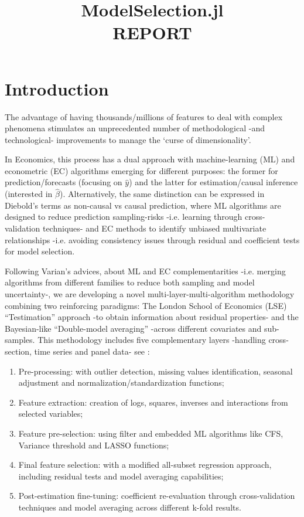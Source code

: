 \documentclass{article}
\title{ModelSelection.jl \\
       \vspace{5mm} REPORT}
\begin{document}
\maketitle

\vspace{5mm}
\tableofcontents
\clearpage


\section{Introduction}
The advantage of having thousands/millions of features to deal with complex phenomena stimulates an unprecedented number of methodological -and technological- improvements to manage the ‘curse of dimensionality’. 

In Economics, this process has a dual approach with machine-learning (ML) and econometric (EC) algorithms emerging for different purposes: the former for prediction/forecasts (focusing on $\hat{y}$) and the latter for estimation/causal inference (interested in $\hat{\beta}$). Alternatively, the same distinction can be expressed in Diebold’s terms as non-causal vs causal prediction, where ML algorithms are designed to reduce prediction sampling-risks -i.e. learning through cross-validation techniques- and EC methods to identify unbiased multivariate relationships -i.e. avoiding consistency issues through residual and coefficient tests for model selection. 

Following Varian’s advices, about ML and EC complementarities -i.e. merging algorithms from different families to reduce both sampling and model uncertainty-, we are developing a novel multi-layer-multi-algorithm methodology combining two reinforcing paradigms: The London School of Economics (LSE) “Testimation” approach -to obtain information about residual properties- and the Bayesian-like “Double-model averaging” -across different covariates and sub-samples. This methodology includes five complementary layers -handling cross-section, time series and panel data- see \cite{gsreg2019}: 

\begin{enumerate}
    \item Pre-processing: with outlier detection, missing values identification, seasonal adjustment and normalization/standardization functions; 
    
    \item Feature extraction: creation of logs, squares, inverses and interactions from selected variables;
    
    \item Feature pre-selection: using filter and embedded ML algorithms like CFS, Variance threshold and LASSO functions; 
    
    \item Final feature selection: with a modified all-subset regression approach, including residual tests and model averaging capabilities; 
    
    \item Post-estimation fine-tuning: coefficient re-evaluation through cross-validation techniques and model averaging across different k-fold results. 
\end{enumerate}
\end{document}
